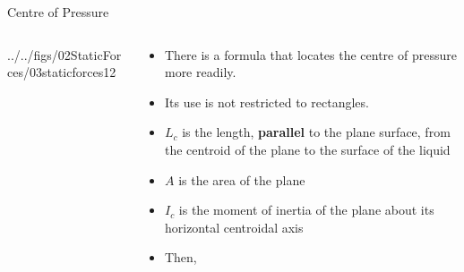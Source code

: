 \documentclass[9pt,xcolor={svgnames, x11names},professionalfonts, mathserif]{beamer}
\begin{document}

\begin{frame}{Centre of Pressure}
	\begin{columns}
		\begin{column}{0.5\textwidth}
			\begin{mybox}
				\begin{cfig}[0.56]{../../figs/02StaticForces/03staticforces12}\end{cfig}
			\end{mybox}
		\end{column}
		\begin{column}{0.5\textwidth}
			\smallskip
			\begin{itemize}
				\item There is a formula that locates the centre of pressure more readily.
				\item Its use is not restricted to rectangles.
				\item $L_c$ is the length, {\bfseries parallel} to the plane surface, from the centroid of the plane  to the surface of the liquid
				\item $A$ is the area of the plane
				\item $I_c$ is the moment of inertia of the plane about its horizontal centroidal axis
				\item Then,\pars
				      \cmini{
				      	\begin{mybox}
				      		\vspace{-0.25cm}
				      		\[\bm{ L_p - L_c =\frac{I_c}{L_c\cdot A} }\]
				      	\end{mybox}
				      }
			\end{itemize}
		\end{column}
	\end{columns}
	
\end{frame}



\end{document}

